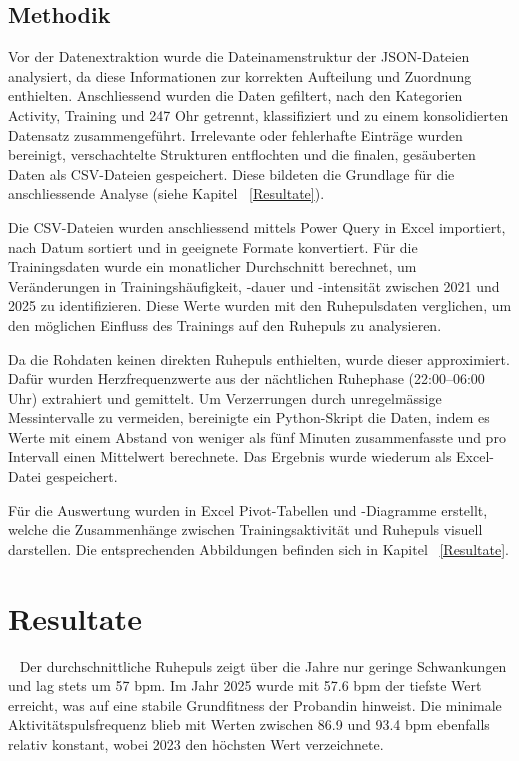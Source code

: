 \documentclass[a4paper,12pt]{scrartcl}
\begin{document}
\subsection{Methodik} 
\label{Methodik}
Vor der Datenextraktion wurde die Dateinamenstruktur der JSON-Dateien analysiert, da diese Informationen zur korrekten Aufteilung und Zuordnung enthielten. Anschliessend wurden die Daten gefiltert, nach den Kategorien Activity, Training und 247 Ohr getrennt, klassifiziert und zu einem konsolidierten Datensatz zusammengeführt. Irrelevante oder fehlerhafte Einträge wurden bereinigt, verschachtelte Strukturen entflochten und die finalen, gesäuberten Daten als CSV-Dateien gespeichert. Diese bildeten die Grundlage für die anschliessende Analyse (siehe Kapitel ~\ref{Resultate}).

Die CSV-Dateien wurden anschliessend mittels Power Query in Excel importiert, nach Datum sortiert und in geeignete Formate konvertiert. Für die Trainingsdaten wurde ein monatlicher Durchschnitt berechnet, um Veränderungen in Trainingshäufigkeit, -dauer und -intensität zwischen 2021 und 2025 zu identifizieren. Diese Werte wurden mit den Ruhepulsdaten verglichen, um den möglichen Einfluss des Trainings auf den Ruhepuls zu analysieren.

Da die Rohdaten keinen direkten Ruhepuls enthielten, wurde dieser approximiert. Dafür wurden Herzfrequenzwerte aus der nächtlichen Ruhephase (22:00–06:00 Uhr) extrahiert und gemittelt. Um Verzerrungen durch unregelmässige Messintervalle zu vermeiden, bereinigte ein Python-Skript die Daten, indem es Werte mit einem Abstand von weniger als fünf Minuten zusammenfasste und pro Intervall einen Mittelwert berechnete. Das Ergebnis wurde wiederum als Excel-Datei gespeichert.

Für die Auswertung wurden in Excel Pivot-Tabellen und -Diagramme erstellt, welche die Zusammenhänge zwischen Trainingsaktivität und Ruhepuls visuell darstellen. Die entsprechenden Abbildungen befinden sich in Kapitel ~\ref{Resultate}.


\section{Resultate}~\label{Resultate}
Der durchschnittliche Ruhepuls zeigt über die Jahre nur geringe Schwankungen und lag stets um 57 bpm. Im Jahr 2025 wurde mit 57.6 bpm der tiefste Wert erreicht, was auf eine stabile Grundfitness der Probandin hinweist. Die minimale Aktivitätspulsfrequenz blieb mit Werten zwischen 86.9 und 93.4 bpm ebenfalls relativ konstant, wobei 2023 den höchsten Wert verzeichnete. 
\end{document}
